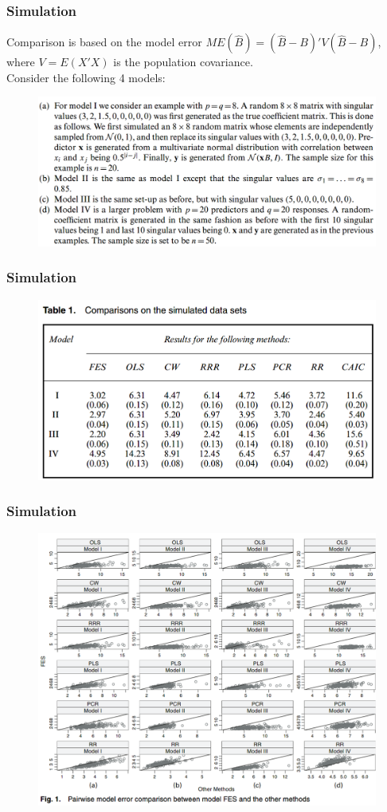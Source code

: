 \documentclass{beamer}
\begin{document}
	\begin{frame}
		\frametitle{Simulation}
		Comparison is based on the model error $ME(\hat{B})=(\hat{B} - B)'V(\hat{B}-B)$, where $V= E(X'X)$ is the population covariance.\\
		Consider the following 4 models:
		\begin{figure}
			\includegraphics[width=1\linewidth]{image007.png}
		\end{figure}
	\end{frame}
	
	\begin{frame}
		\frametitle{Simulation}
		\begin{figure}
			\includegraphics[width=.8\linewidth]{image006.png}
		\end{figure}
	\end{frame}
	
	\begin{frame}
		\frametitle{Simulation}
		\begin{figure}
			\includegraphics[width=.8\linewidth]{image008.png}
		\end{figure}
	\end{frame}
	
\end{document}
